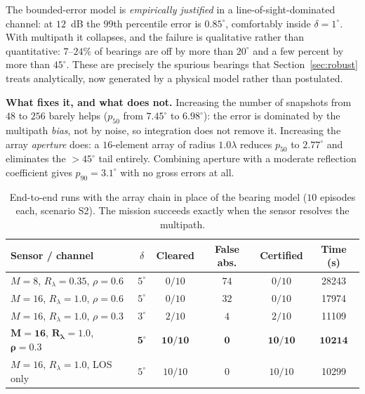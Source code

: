 \documentclass[journal,10pt]{IEEEtran}
\theoremstyle{definition}
\begin{document}
The bounded-error model is \emph{empirically justified} in a line-of-sight-dominated channel: at
$12$~dB the $99$th percentile error is $0.85^\circ$, comfortably inside $\delta=1^\circ$. With
multipath it collapses, and the failure is qualitative rather than quantitative: $7$--$24\%$ of
bearings are off by more than $20^\circ$ and a few percent by more than $45^\circ$. These are
precisely the spurious bearings that Section~\ref{sec:robust} treats analytically, now generated
by a physical model rather than postulated.

\noindent\textbf{What fixes it, and what does not.} Increasing the number of snapshots from $48$ to
$256$ barely helps ($p_{50}$ from $7.45^\circ$ to $6.98^\circ$): the error is dominated by the
multipath \emph{bias}, not by noise, so integration does not remove it. Increasing the array
\emph{aperture} does: a $16$-element array of radius $1.0\lambda$ reduces $p_{50}$ to
$2.77^\circ$ and eliminates the $>45^\circ$ tail entirely. Combining aperture with a moderate
reflection coefficient gives $p_{90}=3.1^\circ$ with no gross errors at all.

\begin{table}[t]
\caption{End-to-end runs with the array chain in place of the bearing model ($10$ episodes each,
scenario S2). The mission succeeds exactly when the sensor resolves the multipath.}
\label{tab:rfrun}
\centering
\small
\begin{tabular}{lccccc}
\toprule
Sensor / channel & $\delta$ & Cleared & \textbf{False abs.} & Certified & Time (s) \\
\midrule
$M{=}8$, $R_\lambda{=}0.35$, $\rho{=}0.6$ & $5^\circ$ & $0/10$ & $74$ & $0/10$ & 28243 \\
$M{=}16$, $R_\lambda{=}1.0$, $\rho{=}0.6$  & $5^\circ$ & $0/10$ & $32$ & $0/10$ & 17974 \\
$M{=}16$, $R_\lambda{=}1.0$, $\rho{=}0.3$  & $3^\circ$ & $2/10$ & $4$  & $2/10$ & 11109 \\
$\bm{M{=}16}$, $\bm{R_\lambda{=}1.0}$, $\bm{\rho{=}0.3}$ & $\bm{5^\circ}$ &
$\bm{10/10}$ & $\bm{0}$ & $\bm{10/10}$ & $\bm{10214}$ \\
$M{=}16$, $R_\lambda{=}1.0$, LOS only      & $5^\circ$ & $10/10$ & $0$ & $10/10$ & 10299 \\
\bottomrule
\end{tabular}
\end{table}
\end{document}
